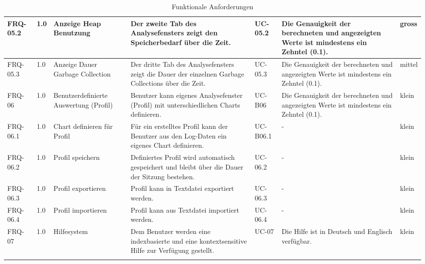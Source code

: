 \begin{landscape}
\begin{longtable}{|p{1.8cm}|p{0.7cm}|p{2.5cm}|p{5cm}|p{1.6cm}|p{4cm}|p{0.9cm}|}
   FRQ-05.2 & 1.0 & Anzeige Heap Benutzung & Der zweite Tab des Analysefensters zeigt den Speicherbedarf über die Zeit. & UC-05.2 & Die Genauigkeit der berechneten und angezeigten Werte ist mindestens ein Zehntel (0.1). & gross 
 \\\hline

   FRQ-05.3 & 1.0 & Anzeige Dauer Garbage Collection & Der dritte Tab des Analysefensters zeigt die Dauer der einzelnen Garbage Collections über die Zeit. & UC-05.3 & Die Genauigkeit der berechneten und angezeigten Werte ist mindestens ein Zehntel (0.1). & mittel 
 \\\hline

   FRQ-06 & 1.0 & Benutzerdefinierte Auswertung (Profil) & Benutzer kann eigenes Analysefenster (Profil) mit unterschiedlichen Charts definieren. & UC-B06 & Die Genauigkeit der berechneten und angezeigten Werte ist mindestens ein Zehntel (0.1). & klein \\\hline

   FRQ-06.1 & 1.0 & Chart definieren für Profil & Für ein erstelltes Profil kann der Benutzer aus den Log-Daten ein eigenes Chart definieren. & UC-B06.1 & - & klein \\\hline

   FRQ-06.2 & 1.0 & Profil speichern & Definiertes Profil wird automatisch gespeichert und bleibt über die Dauer der Sitzung bestehen. & UC-06.2 & - & klein \\\hline

  FRQ-06.3 & 1.0 & Profil exportieren & Profil kann in Textdatei exportiert werden. & UC-06.3 & - & klein \\\hline

  FRQ-06.4 & 1.0 & Profil importieren & Profil kann aus Textdatei importiert werden. & UC-06.4 & - & klein \\\hline

  FRQ-07 & 1.0 & Hilfesystem &  Dem Benutzer werden eine indexbasierte und eine kontextsensitive Hilfe zur Verfügung gestellt. & UC-07 & Die Hilfe ist in Deutsch und Englisch verfügbar. & klein \\\hline

\caption{Funktionale Anforderungen}
\end{longtable}
\end{landscape}

